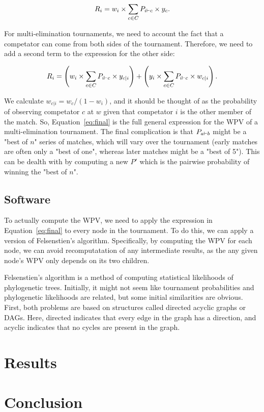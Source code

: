 \documentclass{article}
\begin{document}
\begin{equation}
  R_i = w_i \times \sum_{c\in C} P_{i \vdash c} \times y_c.
\end{equation}

For multi-elimination tournaments, we need to account the fact that a competator can come from both sides of the
tournament. Therefore, we need to add a second term to the expression for the other side:

\begin{equation}
  R_i = \left(w_i \times \sum_{c\in C} P_{i \vdash c} \times y_{c|i} \right) +
        \left(y_i \times \sum_{c\in C} P_{i \vdash c} \times w_{c|i} \right).
        \label{eq:final}
\end{equation}

We calculate $w_{c|i} = w_{c}/(1 - w_i)$, and it should be thought of as the probability of observing competator $c$ at
$w$ given that competator $i$ is the other member of the match. So, Equation~\ref{eq:final} is the full general
expression for the WPV of a multi-elimination tournament. The final complication is that $P_{a \vdash b}$ might be a "best
of $n$" series of matches, which will vary over the tournament (early matches are often only a "best of one", whereas
later matches might be a "best of 5"). This can be dealth with by computing a new $P'$ which is the pairwise probability
of winning the "best of $n$".

\subsection{Software}

To actually compute the WPV, we need to apply the expression in Equation~\ref{eq:final} to every node in the tournament. 
To do this, we can apply a version of Felsenstien's algorithm. Specifically, by computing the WPV for each node, we can
avoid recomputatation of any intermediate results, as the any given node's WPV only depends on its two children.

Felsenstien's algorithm is a method of computing statistical likelihoods of phylogenetic trees. Initially, it might not
seem like tournament probabilities and phylogenetic likelihoods are related, but some initial similarities are obvious.
First, both problems are based on structures called directed acyclic graphs or DAGs. Here, directed indicates that every
edge in the graph has a direction, and acyclic indicates that no cycles are present in the graph. 

\section{Results}

\section{Conclusion}
\end{document}
